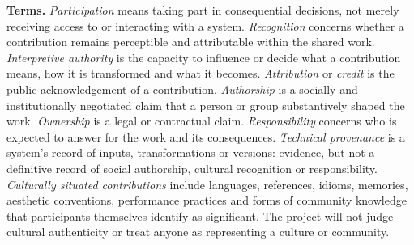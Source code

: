 \textbf{Terms.} \emph{Participation} means taking part in consequential
decisions, not merely receiving access to or interacting with a system.
\emph{Recognition} concerns whether a contribution remains perceptible and
attributable within the shared work. \emph{Interpretive authority} is the
capacity to influence or decide what a contribution means, how it is
transformed and what it becomes. \emph{Attribution} or \emph{credit} is the
public acknowledgement of a contribution. \emph{Authorship} is a socially
and institutionally negotiated claim that a person or group substantively
shaped the work. \emph{Ownership} is a legal or contractual claim.
\emph{Responsibility} concerns who is expected to answer for the work and
its consequences. \emph{Technical provenance} is a system's record of
inputs, transformations or versions: evidence, but not a definitive record
of social authorship, cultural recognition or responsibility.
\emph{Culturally situated contributions} include languages, references,
idioms, memories, aesthetic conventions, performance practices and forms of
community knowledge that participants themselves identify as significant.
The project will not judge cultural authenticity or treat anyone as
representing a culture or community.
